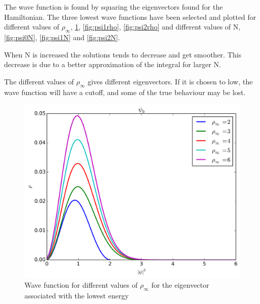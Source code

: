 \documentclass[11pt,a4paper,english,draft]{article}
\numberwithin{equation}{section}
\newcommand{\figurewidth}{.85\textwidth}
\begin{document}
The wave function is found by squaring the eigenvectors found for the 
Hamiltonian. The three lowest wave functions have been selected and
plotted for different values of $\rho_\infty$,
\ref{fig:psi0rho}, \ref{fig:psi1rho}, \ref{fig:psi2rho} and 
different values of N, \ref{fig:psi0N}, \ref{fig:psi1N} and 
\ref{fig:psi2N}.

When N is increased the solutions tends to decrease and get smoother.
This decrease is due to a better approximation of the integral for 
larger N.

The different values of $\rho_\infty$ gives different eigenvectors.
If it is chosen to low, the wave function will have a cutoff, and some 
of the true behaviour may be lost.


\begin{figure}
\centering
\includegraphics[width=\figurewidth]{../results/psi_inf_compare_psi0.png}
\caption{Wave function for different values of $\rho_\infty$ for
the eigenvector associated with the lowest energy}
\label{fig:psi0rho}
\end{figure}
\end{document}
